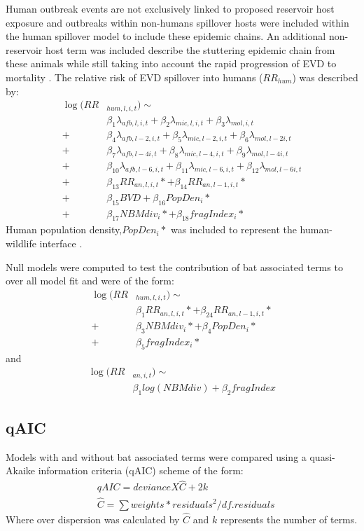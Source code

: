 \documentclass[9pt,twoside,lineno]{pnas-new}
\begin{document}
Human outbreak events are not exclusively linked to proposed reservoir host exposure \cite{Pourrut2005TheAfrica} and outbreaks within non-humans spillover hosts were included within the human spillover model to include these epidemic chains. An additional non-reservoir host term was included describe the stuttering epidemic chain from these animals while still taking into account the rapid progression of EVD to mortality \cite{Swanepoel1996ExperimentalVirus}. The relative risk of EVD spillover into humans ($RR_{hum}$) was described by:
\[
    \begin{split}
\log(RR&_{hum, l, i, t}) \sim \\
&\beta_1 \lambda_{afb, l, i, t} + \beta_2 \lambda_{mic, l, i, t} + \beta_3 \lambda_{mol, i, t} \\
 + &\beta_4 \lambda_{afb, l-2, i, t} + \beta_5 \lambda_{mic, l-2, i, t} + \beta_6 \lambda_{mol, l-2 i, t} \\
 + &\beta_7 \lambda_{afb, l-4 i, t} + \beta_8 \lambda_{mic, l-4, i, t} + \beta_9 \lambda_{mol, l-4 i, t} \\
 + &\beta_{10} \lambda_{afb, l-6, i, t} + \beta_{11} \lambda_{mic, l-6, i, t} + \beta_{12} \lambda_{mol, l-6 i, t} \\
 + &\beta_{13} RR_{an, l, i, t}* + \beta_{14} RR_{an, l-1, i, t}*  \\
 +&\beta_{15} BVD + \beta_{16} PopDen_{i}*  \\
 + &\beta_{17} NBM div_{i}* + \beta_{18} fragIndex_{i}*  
    \end{split}
\]
Human population density,$PopDen_{i}*$ was included to represent the human-wildlife interface \cite{Plowright2015EcologicalSpillover.}.  \par
Null models were computed to test the contribution of bat associated terms to over all model fit and were of the form:
\[
\begin{split}
   \log(RR&_{hum, l, i, t}) \sim \\ 
   &\beta_{1} RR_{an, l, i, t}* + \beta_{24} RR_{an, l-1, i, t}*  \\
 +&\beta_{3} NBM div_{i}* + \beta_{4} PopDen_{i}*  \\
 + &\beta_{5} fragIndex_{i}*
\end{split}
\]
and 
\[
\begin{split}
   \log(RR& _{an, i, t}) \sim \\
   & \beta_1 log(NBM div) + \beta_2 fragIndex
\end{split}
\]

\subsection*{qAIC}
\label{qAIC}
Models with and without bat associated terms were compared using a quasi-Akaike information criteria (qAIC) scheme of the form: 
\[
    \begin{split}
        &qAIC = deviance X \hat{C} + 2k \\
        &\hat{C} = \sum{weights * residuals^2}/df.residuals
    \end{split}
\]
Where over dispersion was calculated by $\hat{C}$ and $k$ represents the number of terms.\\
\end{document}
